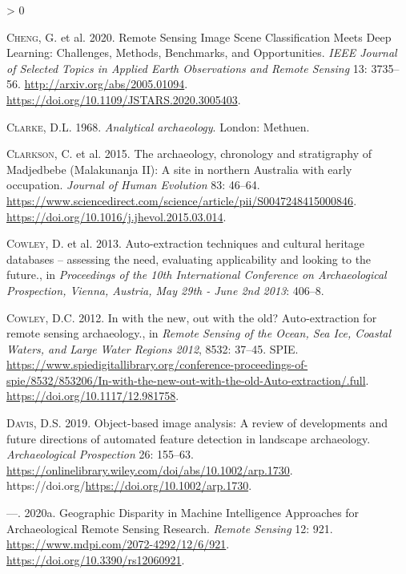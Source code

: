\documentclass[
  12pt,
]{article}
\newlength{\cslhangindent}
\newenvironment{CSLReferences}[2] %
 {%
  \setlength{\parindent}{0pt}
  \ifodd #1 \everypar{\setlength{\hangindent}{\cslhangindent}}\ignorespaces\fi
  \ifnum #2 > 0
  \setlength{\parskip}{#2\baselineskip}
  \fi
 }%
 {}
\begin{document}
\begin{CSLReferences}{1}{0}
\leavevmode\hypertarget{ref-chengRemoteSensingImage2020a}{}%
\textsc{Cheng}, G. et al. 2020. Remote {Sensing} {Image} {Scene} {Classification} {Meets} {Deep} {Learning}: {Challenges}, {Methods}, {Benchmarks}, and {Opportunities}. \emph{IEEE Journal of Selected Topics in Applied Earth Observations and Remote Sensing} 13: 3735--56. \url{http://arxiv.org/abs/2005.01094}. \url{https://doi.org/10.1109/JSTARS.2020.3005403}.

\leavevmode\hypertarget{ref-clarkeAnalyticalArchaeology1968}{}%
\textsc{Clarke}, D.L. 1968. \emph{Analytical archaeology}. London: Methuen.

\leavevmode\hypertarget{ref-clarksonArchaeologyChronologyStratigraphy2015}{}%
\textsc{Clarkson}, C. et al. 2015. The archaeology, chronology and stratigraphy of {Madjedbebe} ({Malakunanja} {II}): {A} site in northern {Australia} with early occupation. \emph{Journal of Human Evolution} 83: 46--64. \url{https://www.sciencedirect.com/science/article/pii/S0047248415000846}. \url{https://doi.org/10.1016/j.jhevol.2015.03.014}.

\leavevmode\hypertarget{ref-cowleyAutoextractionTechniquesCultural2013}{}%
\textsc{Cowley}, D. et al. 2013. Auto-extraction techniques and cultural heritage databases -- assessing the need, evaluating applicability and looking to the future., in \emph{Proceedings of the 10th {International} {Conference} on {Archaeological} {Prospection}, {Vienna}, {Austria}, {May} 29th - {June} 2nd 2013}: 406--8.

\leavevmode\hypertarget{ref-cowleyNewOutOld2012}{}%
\textsc{Cowley}, D.C. 2012. In with the new, out with the old? {Auto}-extraction for remote sensing archaeology., in \emph{Remote {Sensing} of the {Ocean}, {Sea} {Ice}, {Coastal} {Waters}, and {Large} {Water} {Regions} 2012}, 8532: 37--45. SPIE. \url{https://www.spiedigitallibrary.org/conference-proceedings-of-spie/8532/853206/In-with-the-new-out-with-the-old-Auto-extraction/.full}. \url{https://doi.org/10.1117/12.981758}.

\leavevmode\hypertarget{ref-davisObjectbasedImageAnalysis2019}{}%
\textsc{Davis}, D.S. 2019. Object-based image analysis: A review of developments and future directions of automated feature detection in landscape archaeology. \emph{Archaeological Prospection} 26: 155--63. \url{https://onlinelibrary.wiley.com/doi/abs/10.1002/arp.1730}. https://doi.org/\url{https://doi.org/10.1002/arp.1730}.

\leavevmode\hypertarget{ref-davisGeographicDisparityMachine2020a}{}%
---. 2020a. Geographic {Disparity} in {Machine} {Intelligence} {Approaches} for {Archaeological} {Remote} {Sensing} {Research}. \emph{Remote Sensing} 12: 921. \url{https://www.mdpi.com/2072-4292/12/6/921}. \url{https://doi.org/10.3390/rs12060921}.


\end{CSLReferences}
\end{document}
